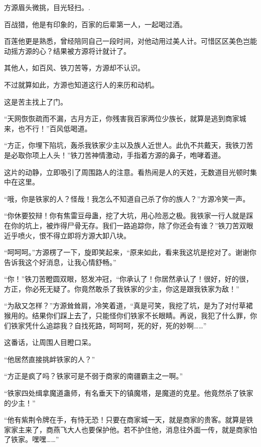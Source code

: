 
\begin{this_body}

方源眉头微挑，目光轻扫。.

百战猎，他是有印象的，百家的后辈第一人，一起喝过酒。

百莲他更是熟悉，曾经陪同自己一段时间，对他动用过美人计。可惜区区美色岂能动摇方源的心？结果被方源将计就计了。

其他人，如百风、铁刀苦等，方源却不认识。

不过就算如此，方源也知道这行人的来历和动机。

这是苦主找上了门。

“天网恢恢疏而不漏，古月方正，你残害我百家两位少族长，就算是逃到商家城来，也不行！”百风低喝道。

“方正，你埋下陷坑，轰杀我铁家少主以及族人近世人。此仇不共戴天，我铁刀苦是必取你项上人头！”铁刀苦神情激动，手指着方源的鼻子，咆哮着道。

这片的动静，立即吸引了周围路人的注意。看热闹是人的天姓，无数道目光顿时集中在这里。

“哦，你是铁家的人？怪哉！我怎么不知道自己杀了你的族人？”方源冷笑一声。

“你休要狡辩！你有焦雷豆母蛊，挖了大坑，用心险恶之极。我铁家一行人就是踩在你的坑上，被炸得尸骨无存。我们一路追踪你，除了你还会有谁？”铁刀苦双眼近乎喷火，恨不得立即将方源大卸八块。

“呵呵呵。”方源楞了一下，旋即笑起来，“原来如此，看来我这坑是挖对了。谢谢你告诉我这个好消息，让我心情舒畅。”

“你！”铁刀苦瞪圆双眼，怒发冲冠，“你承认了！你居然承认了！很好，好的很，方正，你必死无疑了。你竟然敢杀了我铁家的少主，你这是跟我铁家为敌！”

“为敌又怎样？”方源耸耸肩，冷笑着道，“真是可笑，我挖了坑，是为了对付草裙猴用的。结果你们踩上去了，只能怪你们铁家不长眼睛。再说，我犯了什么罪，你们铁家凭什么追踪我？自找死路，呵呵呵，死的好，死的妙啊……”

这番话，让周围人目瞪口呆。

“他居然直接挑衅铁家的人？”

“方正是疯了吗？铁家可是不弱于商家的南疆霸主之一啊。”

“铁家四处缉拿魔道蛊师，有名垂天下的镇魔塔，是魔道的克星。他竟然杀了铁家的少主！”

“他有紫荆令牌在手，有恃无恐！只要在商家城一天，就是商家的贵客。就算是铁家家主来了，商燕飞大人也要保护他。若不护住他，消息往外面一传，就是商家怕了铁家。嘿嘿……”


\end{this_body}
